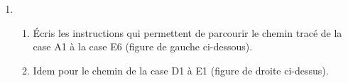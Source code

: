 \documentclass[class=report,crop=false, 12pt]{standalone}
\begin{document}
\begin{activite}
\begin{enumerate}
\begin{enumerate}
    \centerline{}
\medskip    
    
    
  \end{enumerate} 
 
  
  \item
  \begin{enumerate}
    \item Écris les instructions qui permettent de parcourir le chemin tracé de la case A1 à la case E6 (figure de gauche ci-dessous).
\medskip    
  
     
    \item Idem pour le chemin de la case D1 à E1 (figure de droite ci-dessus). 




  \end{enumerate}   
\end{enumerate}



\end{activite}
\end{document}
